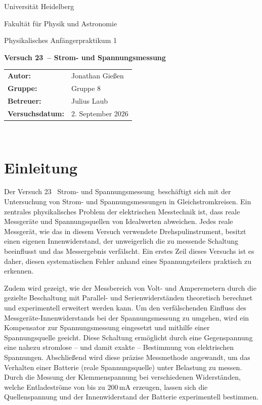 \documentclass[12pt,a4paper,titlepage]{scrartcl}
\numberwithin{equation}{section}
\numberwithin{table}{section}
\numberwithin{figure}{section}
\newcommand{\versuch}{Versuch 23}
\newcommand{\titel}{Strom- und Spannungsmessung}
\newcommand{\praktikum}{Physikalisches Anfängerpraktikum 1}
\newcommand{\autor}{Jonathan Gießen}
\newcommand{\gruppe}{Gruppe 8}
\newcommand{\datum}{2. September 2026}
\newcommand{\betreuer}{Julius Laub}
\begin{document}
\pagestyle{scrheadings}

\begin{titlepage}



    \centering
    \vspace*{4cm}
    {\large Universität Heidelberg\par}
    {\small Fakultät für Physik und Astronomie\par}
    {\Large \praktikum\par}
    \vspace{0.8cm}
    {\LARGE \bfseries \versuch\ -- \titel\par}
    \vspace{1.5cm}

    \begin{tabular}{ll}
        \textbf{Autor:} & \autor\\
        \textbf{Gruppe:} & \gruppe\\
        \textbf{Betreuer:} & \betreuer\\
        \textbf{Versuchsdatum:} & \datum\\
    \end{tabular}

    \vfill
    \hrulefill\
\end{titlepage}

\tableofcontents

\clearpage
\section{Einleitung}\label{Einleitung}
Der Versuch 23 \glqq\ Strom- und Spannungsmessung\grqq\ beschäftigt sich
mit der Untersuchung von Strom- und Spannungsmessungen in Gleichstromkreisen.
Ein zentrales physikalisches Problem der elektrischen Messtechnik ist, dass reale Messgeräte und Spannungsquellen
von Idealwerten abweichen.  Jedes reale Messgerät, wie das in diesem Versuch verwendete Drehspulinstrument,
besitzt einen eigenen Innenwiderstand, der unweigerlich die zu messende Schaltung beeinflusst und das Messergebnis verfälscht.
Ein erstes Zeil dieses Versuchs ist es daher, diesen systematischen Fehler anhand eines Spannungsteilers praktisch zu erkennen.
\medspace\ 

Zudem wird gezeigt, wie der Messbereich von Volt- und Amperemetern durch die gezielte Beschaltung mit Parallel- und Serienwiderständen
theoretisch berechnet und experimentell erweitert werden kann.  Um den verfälschenden Einfluss des Messgeräte-Innenwiderstands bei der 
Spannungsmessung zu umgehen, wird ein Kompensator zur Spannungsmessung eingesetzt und mithilfe einer Spannungsquelle geeicht. 
Diese Schaltung ermöglicht durch eine Gegenspannung eine nahezu stromlose – und damit exakte – Bestimmung von elektrischen Spannungen.  
Abschließend wird diese präzise Messmethode angewandt, um das Verhalten einer Batterie (reale Spannungsquelle) unter Belastung zu messen.
Durch die Messung der Klemmenspannung bei verschiedenen Widerständen, welche Entladeströme von bis zu $200\,\text{mA}$ erzeugen, 
lassen sich die Quellenspannung und der Innenwiderstand der Batterie experimentell bestimmen.
\end{document}
